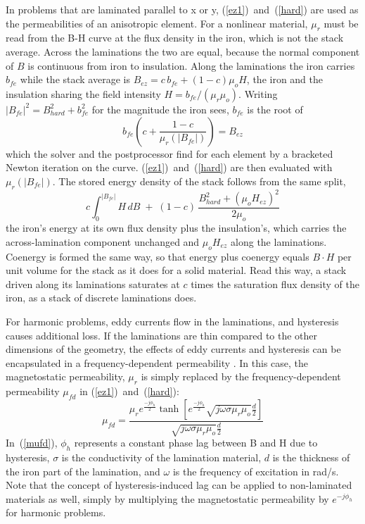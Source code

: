\documentclass[12pt]{report}
\newcommand{\be}{\begin{equation}}
\newcommand{\ee}{\end{equation}}
\begin{document}
In problems that are laminated parallel to x or y,
(\ref{ez1})~and~(\ref{hard}) are used as the permeabilities of an
anisotropic element.  For a nonlinear material, $\mu_r$ must be read
from the B-H curve at the flux density in the iron, which is not the
stack average.  Across the laminations the two are equal, because the
normal component of $B$ is continuous from iron to insulation.  Along
the laminations the iron carries $b_{fe}$ while the stack average is
$B_{ez} = c\, b_{fe} + (1-c) \mu_o H$, the iron and the insulation
sharing the field intensity $H = b_{fe}/(\mu_r \mu_o)$.  Writing
$|B_{fe}|^2 = B_{hard}^2 + b_{fe}^2$ for the magnitude the iron sees,
$b_{fe}$ is the root of
\be \label{lamiron} b_{fe} \left( c + \frac{1-c}{\mu_r(|B_{fe}|)}
\right) = B_{ez} \ee
which the solver and the postprocessor find for each element by a
bracketed Newton iteration on the curve.  (\ref{ez1})~and~(\ref{hard})
are then evaluated with $\mu_r(|B_{fe}|)$.  The stored energy density
of the stack follows from the same split,
\be c \int_0^{|B_{fe}|} H\, dB \;+\; (1-c)\, \frac{B_{hard}^2 +
(\mu_o H_{ez})^2}{2 \mu_o} \ee
the iron's energy at its own flux density plus the insulation's, which
carries the across-lamination component unchanged and $\mu_o H_{ez}$
along the laminations.  Coenergy is formed the same way, so that
energy plus coenergy equals $B \cdot H$ per unit volume for the stack
as it does for a solid material.  Read this way, a stack driven along
its laminations saturates at $c$ times the saturation flux density of
the iron, as a stack of discrete laminations does.

For harmonic problems, eddy currents flow in the laminations, and
hysteresis causes additional loss.  If the laminations are thin
compared to the other dimensions of the geometry, the effects of
eddy currents and hysteresis can be encapsulated in a
frequency-dependent permeability \cite{stoll}.  In this case, the
magnetostatic permeability, $\mu_r$ is simply replaced by the
frequency-dependent permeability $\mu_{fd}$ in
(\ref{ez1})~and~(\ref{hard}):
\be \label{mufd}
\mu_{fd} = \frac{\mu_r e^{\frac{-j \phi_h}{2}} \tanh \left[ e^{\frac{-j \phi_h}{2}}
\sqrt{j \omega \sigma \mu_r \mu_o} \frac{d}{2} \right]}
{\sqrt{j \omega \sigma \mu_r \mu_o} \frac{d}{2}} \ee
 In~(\ref{mufd}), $\phi_h$ represents a constant phase lag between
B and H due to hysteresis, $\sigma$ is the conductivity of the
lamination material, $d$ is the thickness of the iron part of the
lamination, and $\omega$ is the frequency of excitation in rad/s.
Note that the concept of hysteresis-induced lag can be applied to
non-laminated materials as well, simply by multiplying the
magnetostatic permeability by $e^{-j \phi_h}$ for harmonic
problems.
\end{document}
